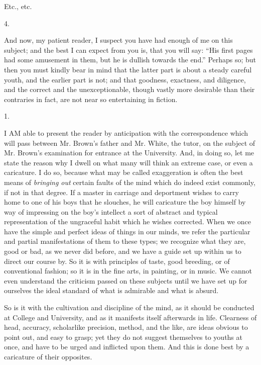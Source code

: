 Etc., etc.

4.

And now, my patient reader, I suspect you have had enough of me on
this subject; and the best I can expect from you is, that you will
say: ``His first pages had some amusement in them, but he is
dullish towards the end.'' Perhaps so; but then you must kindly
bear in mind that the latter part is about a steady careful youth, and
the earlier part is not; and that goodness, exactness, and diligence,
and the correct and the unexceptionable, though vastly more desirable
than their contraries in fact, are not near so entertaining in
fiction.


1.

I AM able to present the reader by anticipation with the
correspondence which will pass between Mr. Brown's father and Mr.
White, the tutor, on the subject of Mr. Brown's examination for
entrance at the University. And, in doing so, let me state the reason
why I dwell on what many will think an extreme case, or even a
caricature. I do so, because what may be called exaggeration is often
the best means of \emph{bringing out} certain faults of the mind which
do indeed exist commonly, if not in that degree. If a master in
carriage and deportment wishes to carry home to one of his boys that
he slouches, he will caricature the boy himself by way of impressing
on the boy's intellect a sort of abstract and typical representation
of the ungraceful habit which he wishes corrected. When we once have
the simple and perfect ideas of things in our minds, we refer the
particular and partial manifestations of them to these types; we
recognize what they are, good or bad, as we never did before, and we
have a guide set up within us to direct our course by. So it is with
principles of taste, good breeding, or of conventional fashion; so it
is in the fine arts, in painting, or in music. We cannot even
understand the criticism passed on these subjects until we have set up
for ourselves the ideal standard of what is admirable and what is
absurd.

So is it with the cultivation and discipline of the mind, as
it should be conducted at College and University, and as it manifests
itself afterwards in life. Clearness of head, accuracy, scholarlike
precision, method, and the like, are ideas obvious to point out, and
easy to grasp; yet they do not suggest themselves to youths at once,
and have to be urged and inflicted upon them. And this is done best by
a caricature of their opposites.

